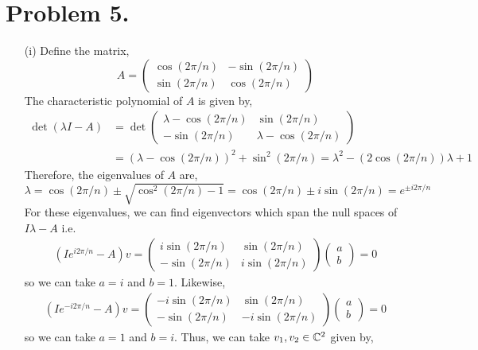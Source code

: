 \documentclass[12pt]{extarticle}
\begin{document}
\section*{Problem 5.}

\begin{enumerate}
\item[(i)] Define the matrix,
\[ A =
\begin{pmatrix}
\cos{(2 \pi /n)} & - \sin{(2 \pi / n)} \\
\sin{(2 \pi / n)} & \cos{(2 \pi / n)}
\end{pmatrix}\]
The characteristic polynomial of $A$ is given by,
\begin{align*}
\det{(\lambda I - A)} & = \det{
\begin{pmatrix}
\lambda - \cos{(2 \pi /n)} &  \sin{(2 \pi / n)} \\
-\sin{(2 \pi / n)} & \lambda - \cos{(2 \pi / n)}
\end{pmatrix} }
\\
& = (\lambda - \cos{(2 \pi / n)})^2 + \sin^2{(2 \pi / n)} = \lambda^2 - (2 \cos{(2 \pi / n)}) \lambda + 1
\end{align*}
Therefore, the eigenvalues of $A$ are,
\[ \lambda = \cos{(2 \pi / n)} \pm \sqrt{ \cos^2{(2 \pi /n)} - 1}  = \cos{(2 \pi / n)} \pm i \sin{(2 \pi / n)} = e^{\pm i 2 \pi / n} \]
For these eigenvalues, we can find eigenvectors which span the null spaces of $I \lambda - A$ i.e.
\begin{align*}
(I e^{i 2\pi /n} - A)v = 
\begin{pmatrix}
i \sin{(2 \pi / n)} & \sin{(2 \pi / n)} \\
-\sin{(2 \pi / n)} &  i \sin{(2 \pi / n)}
\end{pmatrix}
\begin{pmatrix}
a \\
b
\end{pmatrix}
= 0 
\end{align*}
so we can take $a = i$ and $b = 1$. Likewise,
\begin{align*}
(I e^{- i 2\pi /n} - A)v = 
\begin{pmatrix}
-i \sin{(2 \pi / n)} & \sin{(2 \pi / n)} \\
-\sin{(2 \pi / n)} &  -i \sin{(2 \pi / n)}
\end{pmatrix}
\begin{pmatrix}
a \\
b
\end{pmatrix}
= 0 
\end{align*}
so we can take $a = 1$ and $b = i$. Thus, we can take $v_1, v_2 \in \mathbb{C}^2$ given by,

\end{enumerate}
\end{document}
